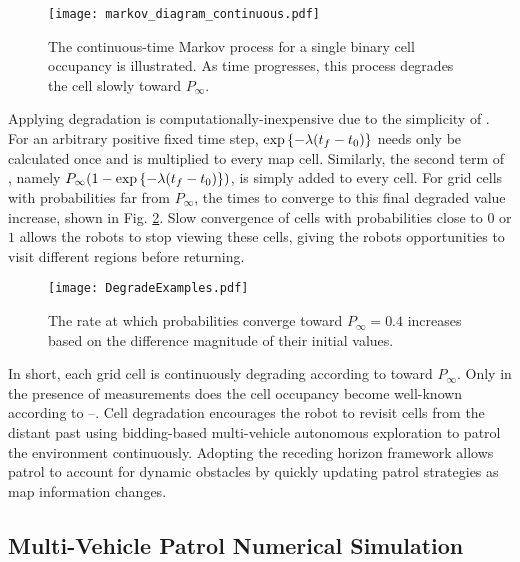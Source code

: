 \begin{figure}
\centering
\texttt{[image: markov\_diagram\_continuous.pdf]}
\caption{The continuous-time Markov process for a single binary cell occupancy is illustrated. As time progresses, this process degrades the cell slowly toward $P_\infty.$}
\label{fig:MarkovDegradeContinuous}
\end{figure}

Applying degradation is computationally-inexpensive due to the simplicity of . For an arbitrary positive fixed time step, $\exp\left\{ -\lambda (t_f-t_0) \right\}$ needs only be calculated once and is multiplied to every map cell. Similarly, the second term of , namely $P_\infty(1-\exp\left\{ -\lambda (t_f-t_0) \right\})$, is simply added to every cell. For grid cells with probabilities far from $P_\infty$, the times to converge to this final degraded value increase, shown in Fig. \ref{fig:DegradeExamples}. Slow convergence of cells with probabilities close to $0$ or $1$ allows the robots to stop viewing these cells, giving the robots opportunities to visit different regions before returning.

\begin{figure}
\centering
\texttt{[image: DegradeExamples.pdf]}
\caption{The rate at which probabilities converge toward $P_\infty=0.4$ increases based on the difference magnitude of their initial values.}
\label{fig:DegradeExamples}
\end{figure}

In short, each grid cell is continuously degrading according to  toward $P_\infty$. Only in the presence of measurements does the cell occupancy become well-known according to --. Cell degradation encourages the robot to revisit cells from the distant past using bidding-based multi-vehicle autonomous exploration to patrol the environment continuously. Adopting the receding horizon framework allows patrol to account for dynamic obstacles by quickly updating patrol strategies as map information changes.


\subsection{Multi-Vehicle Patrol Numerical Simulation}
\label{sec:MultivehiclePatrolSEH}



